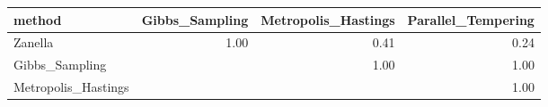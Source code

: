 \begin{table}[ht]
\centering
\begin{tabular}{lrrr}
  \hline
method & Gibbs\_Sampling & Metropolis\_Hastings & Parallel\_Tempering \\ 
  \hline
Zanella & 1.00 & 0.41 & 0.24 \\ 
  Gibbs\_Sampling &  & 1.00 & 1.00 \\ 
  Metropolis\_Hastings &  &  & 1.00 \\ 
   \hline
\end{tabular}
\end{table}
